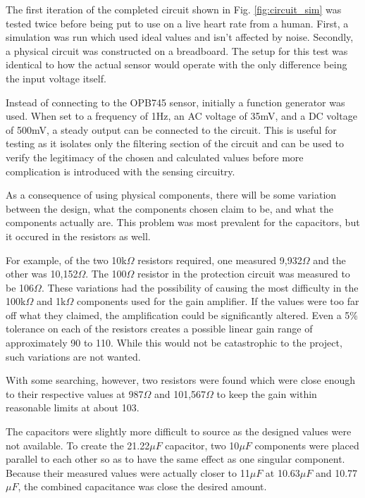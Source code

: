 \documentclass[conference]{IEEEtran}
\begin{document}
    The first iteration of the completed circuit shown in Fig.
    \ref{fig:circuit_sim} was tested twice before being put to use on a live
    heart rate from a human. First, a simulation was run which used ideal
    values and isn't affected by noise. Secondly, a physical circuit was
    constructed on a breadboard. The setup for this test was identical to how
    the actual sensor would operate with the only difference being the input
    voltage itself.

    Instead of connecting to the OPB745 sensor, initially a
    function generator was used. When set to a frequency of 1Hz, an AC voltage
    of 35mV, and a DC voltage of 500mV, a steady output can be connected to
    the circuit. This is useful for testing as it isolates only the filtering
    section of the circuit and can be used to verify the legitimacy of the
    chosen and calculated values before more complication is introduced with
    the sensing circuitry.

    As a consequence of using physical components, there will be some
    variation between the design, what the components chosen claim to be, and
    what the components actually are. This problem was most prevalent for the
    capacitors, but it occured in the resistors as well.

    For example, of the two 10k$\Omega$ resistors required, one measured
    9,932$\Omega$ and the other was 10,152$\Omega$. The 100$\Omega$ resistor
    in the protection circuit was measured to be 106$\Omega$. These variations
    had the possibility of causing the most difficulty in the 100k$\Omega$ and
    1k$\Omega$ components used for the gain amplifier. If the values were too
    far off what they claimed, the amplification could be significantly
    altered. Even a 5\% tolerance on each of the resistors creates a possible
    linear gain range of approximately 90 to 110. While this would not be catastrophic
    to the project, such variations are not wanted.

    With some searching, however, two resistors were found which were close
    enough to their respective values at 987$\Omega$ and 101,567$\Omega$ to
    keep the gain within reasonable limits at about 103.

    The capacitors were slightly more difficult to source as the designed
    values were not available. To create the 21.22$\mu F$ capacitor, two
    10$\mu F$ components were placed parallel to each other so as to have the
    same effect as one singular component. Because their measured values were
    actually closer to 11$\mu F$ at 10.63$\mu F$ and 10.77$\mu F$, the
    combined capacitance was close the desired amount.
\end{document}
